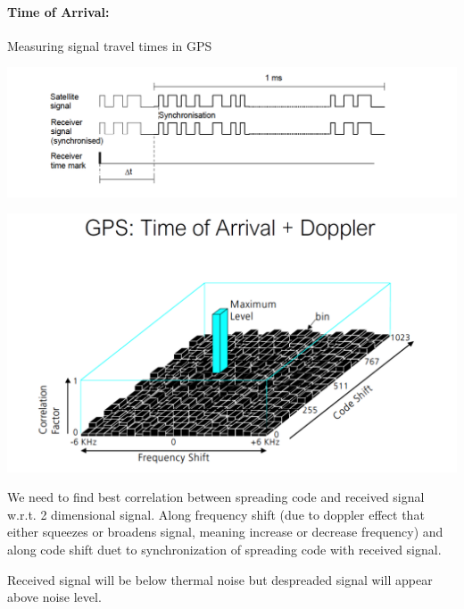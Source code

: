 \paragraph{Time of Arrival:} Measuring signal travel times in GPS 
\begin{minipage}{\linewidth}
    \centering      
    \includegraphics[width=\linewidth]{Figures/L4_arrival_time.PNG} 
\end{minipage}
\begin{minipage}{\linewidth}
    \centering      
    \includegraphics[width=\linewidth]{Figures/L4_signal_pane.PNG} 
\end{minipage}

We need to find best correlation between spreading code and received signal w.r.t. 2 dimensional signal. Along frequency shift (due to doppler effect that either squeezes or broadens signal, meaning increase or decrease frequency) and along code shift duet to synchronization of spreading code with received signal.

Received signal will be below thermal noise but despreaded signal will appear above noise level.

